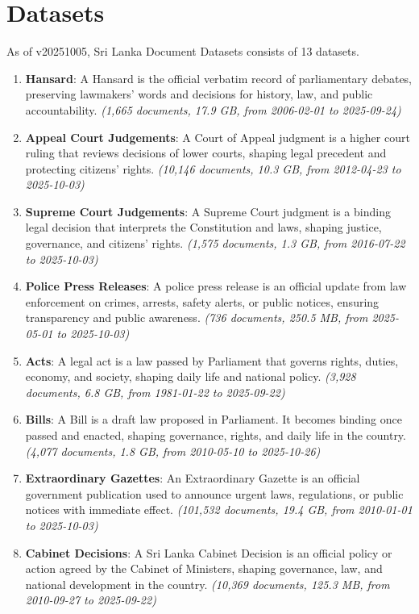 \documentclass[10pt,a4paper]{article}%
\begin{document}
\section{Datasets}%
\label{sec:Datasets}%
As of v20251005, Sri Lanka Document Datasets consists of 13 datasets.%
\begin{enumerate}%
\item%
\textbf{Hansard}: A Hansard is the official verbatim record of parliamentary debates, preserving lawmakers’ words and decisions for history, law, and public accountability.\textit{ (1,665 documents,  17.9 GB,  from 2006{-}02{-}01 to 2025{-}09{-}24)}%
\item%
\textbf{Appeal Court Judgements}: A Court of Appeal judgment is a higher court ruling that reviews decisions of lower courts, shaping legal precedent and protecting citizens’ rights.\textit{ (10,146 documents,  10.3 GB,  from 2012{-}04{-}23 to 2025{-}10{-}03)}%
\item%
\textbf{Supreme Court Judgements}: A Supreme Court judgment is a binding legal decision that interprets the Constitution and laws, shaping justice, governance, and citizens’ rights.\textit{ (1,575 documents,  1.3 GB,  from 2016{-}07{-}22 to 2025{-}10{-}03)}%
\item%
\textbf{Police Press Releases}: A police press release is an official update from law enforcement on crimes, arrests, safety alerts, or public notices, ensuring transparency and public awareness.\textit{ (736 documents,  250.5 MB,  from 2025{-}05{-}01 to 2025{-}10{-}03)}%
\item%
\textbf{Acts}: A legal act is a law passed by Parliament that governs rights, duties, economy, and society, shaping daily life and national policy.\textit{ (3,928 documents,  6.8 GB,  from 1981{-}01{-}22 to 2025{-}09{-}22)}%
\item%
\textbf{Bills}: A Bill is a draft law proposed in Parliament. It becomes binding once passed and enacted, shaping governance, rights, and daily life in the country.\textit{ (4,077 documents,  1.8 GB,  from 2010{-}05{-}10 to 2025{-}10{-}26)}%
\item%
\textbf{Extraordinary Gazettes}: An Extraordinary Gazette is an official government publication used to announce urgent laws, regulations, or public notices with immediate effect.\textit{ (101,532 documents,  19.4 GB,  from 2010{-}01{-}01 to 2025{-}10{-}03)}%
\item%
\textbf{Cabinet Decisions}: A Sri Lanka Cabinet Decision is an official policy or action agreed by the Cabinet of Ministers, shaping governance, law, and national development in the country.\textit{ (10,369 documents,  125.3 MB,  from 2010{-}09{-}27 to 2025{-}09{-}22)}%

\end{enumerate}
\end{document}

